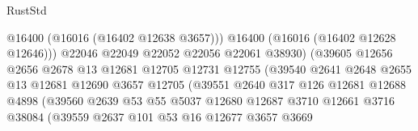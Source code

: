 \begin{lexlean}{RustStd}
\begin{coremodule}
                                          @16400
                                          (@16016 (@16402 @12638 @3657)))
                                        @16400
                                        (@16016 (@16402 @12628 @12646)))
                                      @22046
                                      @22049
                                      @22052
                                      @22056
                                      @22061
                                      @38930)
                                    (@39605
                                      @12656
                                      @2656
                                      @2678
                                      @13
                                      @12681
                                      @12705
                                      @12731
                                      @12755
                                      (@39540
                                        @2641
                                        @2648
                                        @2655
                                        @13
                                        @12681
                                        @12690
                                        @3657
                                        @12705
                                        (@39551
                                          @2640
                                          @317
                                          @126
                                          @12681
                                          @12688
                                          @4898
                                          (@39560
                                            @2639
                                            @53
                                            @55
                                            @5037
                                            @12680
                                            @12687
                                            @3710
                                            @12661
                                            @3716
                                            @38084
                                            (@39559
                                              @2637
                                              @101
                                              @53
                                              @16
                                              @12677
                                              @3657
                                              @3669

\end{coremodule}
\end{lexlean}
